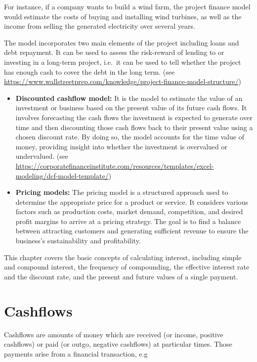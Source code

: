 \documentclass[
]{book}
\theoremstyle{definition}
\theoremstyle{definition}
\theoremstyle{definition}
\theoremstyle{definition}
\theoremstyle{remark}
\begin{document}
For instance, if a company wants to build a wind farm, the project finance model would estimate the costs of buying and installing wind turbines, as well as the income from selling the generated electricity over several years.

The model incorporates two main elements
of the project including loans and debt repayment. It can be used to
assess the risk-reward of lending to or investing in a long-term
project, i.e.~it can be used to tell whether the project has enough
cash to cover the debt in the long term. (see
\url{https://www.wallstreetprep.com/knowledge/project-finance-model-structure/})

\begin{itemize}
\item
  \textbf{Discounted cashflow model:} It is the model to
  estimate the value of an investment or business based on the present value of its future cash flows. It involves forecasting the cash flows the investment is expected to generate over time and then discounting those cash flows back to their present value using a chosen discount rate. By doing so, the model accounts for the time value of money, providing insight into whether the investment is overvalued or undervalued.
  (see
  \url{https://corporatefinanceinstitute.com/resources/templates/excel-modeling/dcf-model-template/})
\item
  \textbf{Pricing models:} The pricing model is a structured approach used to determine the appropriate price for a product or service. It considers various factors such as production costs, market demand, competition, and desired profit margins to arrive at a pricing strategy. The goal is to find a balance between attracting customers and generating sufficient revenue to ensure the business's sustainability and profitability.
\end{itemize}

This chapter covers the basic concepts of calculating interest,
including simple and compound interest, the frequency of compounding,
the effective interest rate and the discount rate, and the present and
future values of a single payment.

\section{Cashflows}\label{cashflows}

Cashflows are amounts of money which are received (or income, positive
cashflows) or paid (or outgo, negative cashflows) at particular times.
Those payments arise from a financial transaction, e.g
\end{document}
